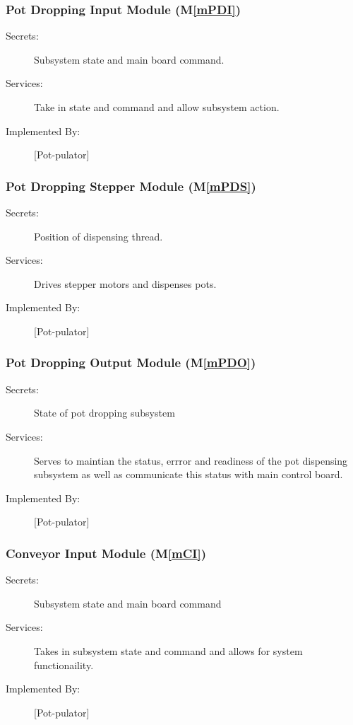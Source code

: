 \documentclass[12pt, titlepage]{article}
\newcommand{\mref}[1]{M\ref{#1}}
\begin{document}
\subsubsection{Pot Dropping Input Module (\mref{mPDI})}
\begin{description}
\item[Secrets:] Subsystem state and main board command.
\item[Services:] Take in state and command and allow subsystem action.
\item[Implemented By:] [Pot-pulator]

\end{description}



\subsubsection{Pot Dropping Stepper Module (\mref{mPDS})}
\begin{description}
\item[Secrets:] Position of dispensing thread.
\item[Services:] Drives stepper motors and dispenses pots.
\item[Implemented By:] [Pot-pulator]

\end{description}

\subsubsection{Pot Dropping Output Module (\mref{mPDO})}
\begin{description}
\item[Secrets:] State of pot dropping subsystem
\item[Services:] Serves to maintian the status, errror and readiness of the pot dispensing subsystem as well as
communicate this status with main control board.
\item[Implemented By:] [Pot-pulator]

\end{description}


\subsubsection{Conveyor Input Module (\mref{mCI})}
\begin{description}
\item[Secrets:] Subsystem state and main board command
\item[Services:] Takes in subsystem state and command and allows for system functionaility.
\item[Implemented By:] [Pot-pulator]

\end{description}
\end{document}
